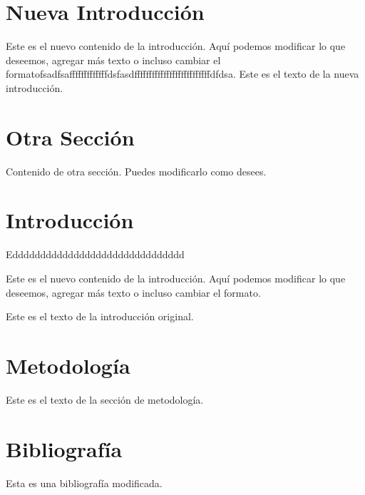 \documentclass{article}%
\begin{document}
%
\normalsize%

\section{Nueva Introducción}
Este es el nuevo contenido de la introducción. Aquí podemos modificar lo que deseemos, 
agregar más texto o incluso cambiar el formatofsadfsafffffffffffffdsfasdffffffffffffffffffffffffffdfdsa.
%
\label{sec:NuevaIntroduccin}%
Este es el texto de la nueva introducción.

%
\section{Otra Sección}%
\label{sec:OtraSeccin}%
Contenido de otra sección. Puedes modificarlo como desees.




\section{Introducción}
Eddddddddddddddddddddddddddddddd

Este es el nuevo contenido de la introducción. Aquí podemos modificar lo que deseemos, 
agregar más texto o incluso cambiar el formato.

Este es el texto de la introducción original.

\section{Metodología}
Este es el texto de la sección de metodología.
%
\section{Bibliografía}%
Esta es una bibliografía modificada.%
\end{document}
